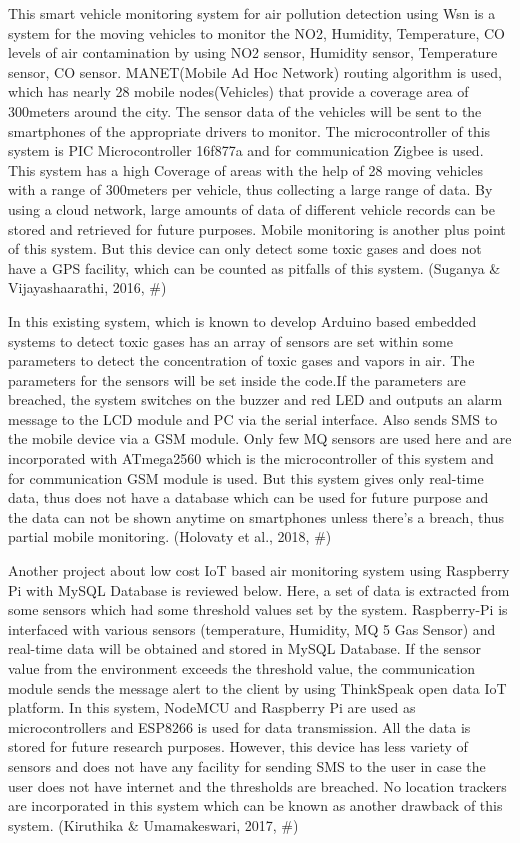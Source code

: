 This smart vehicle monitoring system for air pollution detection using Wsn is a system for the moving vehicles to monitor the NO2, Humidity, Temperature, CO levels of air contamination by using NO2 sensor, Humidity sensor, Temperature sensor, CO sensor. MANET(Mobile Ad Hoc Network) routing algorithm is used, which has nearly 28 mobile nodes(Vehicles) that provide a coverage area of 300meters around the city. The sensor data of the vehicles will be sent to the smartphones of the appropriate drivers to monitor. The microcontroller of this system is PIC Microcontroller 16f877a and for communication Zigbee is used. This system has a high Coverage of areas with the help of 28 moving vehicles with a range of 300meters per vehicle, thus collecting a large range of data. By using a cloud network, large amounts of data of different vehicle records can be stored and retrieved for future purposes. Mobile monitoring is another plus point of this system. But this device can only detect some toxic gases and does not have a GPS facility, which can be counted as pitfalls of this system. (Suganya & Vijayashaarathi, 2016, #)

In this existing system, which is known to develop Arduino based embedded systems to detect toxic gases has an array of sensors are set within some parameters to detect the concentration of toxic gases and vapors in air. The parameters for the sensors will be set inside the code.If the parameters are breached, the system switches on the buzzer and red LED and outputs an alarm message to the LCD module and PC via the serial interface. Also sends SMS to the mobile device via a GSM module. Only few MQ sensors are used here and are incorporated with ATmega2560 which is the  microcontroller of this system and for communication GSM module is used. But this system gives only real-time data, thus does not have a database which can be used for future purpose and the data can not be shown anytime on smartphones unless there’s a breach, thus partial mobile monitoring. (Holovaty et al., 2018, #)

Another project about low cost IoT based air monitoring system using Raspberry Pi with MySQL Database is reviewed below. Here, a set of data is extracted from some sensors which had some threshold values set by the system. Raspberry-Pi is interfaced with various sensors (temperature, Humidity, MQ 5 Gas Sensor) and real-time data will be obtained and stored in MySQL Database. If the sensor value from the environment exceeds the threshold value, the communication module sends the message alert to the client by using ThinkSpeak open data IoT platform. In this system, NodeMCU and Raspberry Pi are used as microcontrollers and ESP8266 is used for data transmission. All the data is stored for future research purposes. However, this device has less variety of sensors and does not have any facility for sending SMS to the user in case the user does not have internet and the thresholds are breached. No location trackers are incorporated in this system which can be known as another drawback of this system. (Kiruthika & Umamakeswari, 2017, #)

